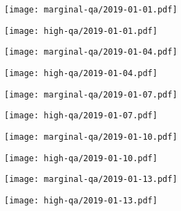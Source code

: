 \documentclass{article}
\begin{document}
\begin{figure}[H]
	\ContinuedFloat
	\centering
	\begin{subfigure}{0.48\linewidth}
		\texttt{[image: marginal-qa/2019-01-01.pdf]}
	\end{subfigure}
	\begin{subfigure}{0.48\linewidth}
		\texttt{[image: high-qa/2019-01-01.pdf]}
	\end{subfigure}
	\begin{subfigure}{0.48\linewidth}
		\texttt{[image: marginal-qa/2019-01-04.pdf]}
	\end{subfigure}
	\begin{subfigure}{0.48\linewidth}
		\texttt{[image: high-qa/2019-01-04.pdf]}
	\end{subfigure}
	\begin{subfigure}{0.48\linewidth}
		\texttt{[image: marginal-qa/2019-01-07.pdf]}
	\end{subfigure}
	\begin{subfigure}{0.48\linewidth}
		\texttt{[image: high-qa/2019-01-07.pdf]}
	\end{subfigure}
	\begin{subfigure}{0.48\linewidth}
		\texttt{[image: marginal-qa/2019-01-10.pdf]}
	\end{subfigure}
	\begin{subfigure}{0.48\linewidth}
		\texttt{[image: high-qa/2019-01-10.pdf]}
	\end{subfigure}
	\begin{subfigure}{0.48\linewidth}
		\texttt{[image: marginal-qa/2019-01-13.pdf]}
	\end{subfigure}
	\begin{subfigure}{0.48\linewidth}
		\texttt{[image: high-qa/2019-01-13.pdf]}
	\end{subfigure}
\end{figure}
\end{document}
